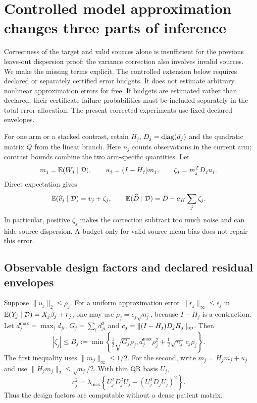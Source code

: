 \section{Controlled model approximation changes three parts of inference}
\label{sec:approximation-control}

Correctness of the target and valid sources alone is insufficient for the
previous leave-out dispersion proof: the variance correction also involves
invalid sources. We make the missing terms explicit. The controlled extension
below requires declared or separately certified error budgets. It does not
estimate arbitrary nonlinear approximation errors for free. If budgets are
estimated rather than declared, their certificate-failure probabilities must
be included separately in the total error allocation. The present corrected
experiments use fixed declared envelopes.

For one arm or a stacked contrast, retain $H_j$, $D_j=\operatorname{diag}(d_j)$ and the
quadratic matrix $Q$ from the linear branch. Here $n_j$ counts observations
in the current arm; contrast bounds combine the two arm-specific quantities. Let
\[
 m_j=\mathbb E(W_j\mid\mathcal D),\qquad u_j=(I-H_j)m_j,\qquad
 \zeta_j=m_j^TD_ju_j.
\]
Direct expectation gives
\[
 \mathbb E(\widehat v_j\mid\mathcal D)=v_j+\zeta_j,\qquad
 \mathbb E(\widehat D\mid\mathcal D)=D-a_K\sum_j\zeta_j.
\]
In particular, positive $\zeta_j$ makes the correction subtract too much noise and
can hide source dispersion. A budget only for valid-source mean bias does not
repair this error.

\subsection{Observable design factors and declared residual envelopes}

Suppose $\|u_j\|_2\le\rho_j$. For a uniform approximation error
$\|r_j\|_\infty\le\epsilon_j$ in
$\mathbb E(Y_j\mid\mathcal D)=X_j\beta_j+r_j$, one may use
$\rho_j=\epsilon_j\sqrt{n_j}$, because $I-H_j$ is a contraction.
Let $d_j^{\max}=\max_i d_{ji}$, $G_j=\sum_i d_{ji}^2$ and
$c_j=\|(I-H_j)D_jH_j\|_{\rm op}$. Then
\[
 |\zeta_j|\le B_j:=\min\left\{
   \tfrac12\sqrt{G_j}\rho_j,
   d_j^{\max}\rho_j^2+\tfrac12\sqrt{n_j}\,c_j\rho_j\right\}.
\]
The first inequality uses $\|m_j\|_\infty\le1/2$. For the second, write
$m_j=H_jm_j+u_j$ and use $\|H_jm_j\|_2\le\sqrt{n_j}/2$.
With thin QR basis $U_j$,
\[
 c_j^2=\lambda_{\max}\left\{
 U_j^TD_j^2U_j-(U_j^TD_jU_j)^2\right\}.
\]
Thus the design factors are computable without a dense patient matrix.

